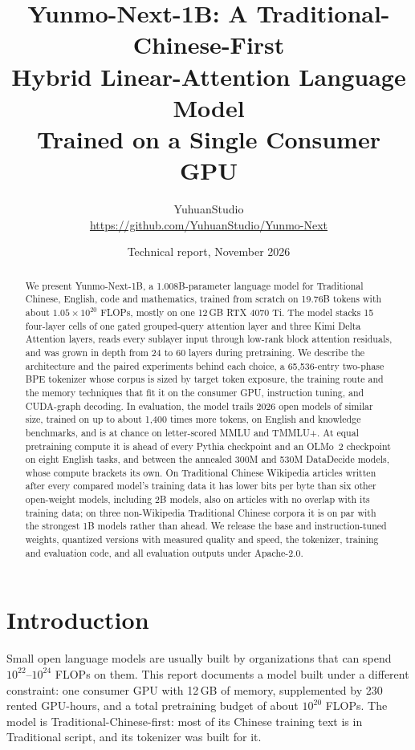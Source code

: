 \documentclass[11pt]{article}
\title{\textbf{Yunmo-Next-1B: A Traditional-Chinese-First\\Hybrid Linear-Attention Language Model\\Trained on a Single Consumer GPU}}
\author{YuhuanStudio\\[2pt]\small\url{https://github.com/YuhuanStudio/Yunmo-Next}}
\date{Technical report, November 2026}
\newcommand{\yn}{Yunmo-Next-1B}
\begin{document}
\maketitle

\begin{abstract}
We present \yn{}, a 1.008B-parameter language model for Traditional Chinese, English, code and mathematics,
trained from scratch on 19.76B tokens with about $1.05\times10^{20}$ FLOPs, mostly on one 12\,GB RTX 4070 Ti.
The model stacks 15 four-layer cells of one gated grouped-query attention layer and three Kimi Delta Attention
layers, reads every sublayer input through low-rank block attention residuals, and was grown in depth from 24
to 60 layers during pretraining. We describe the architecture and the paired experiments behind each choice,
a 65,536-entry two-phase BPE tokenizer whose corpus is sized by target token exposure, the training route and
the memory techniques that fit it on the consumer GPU, instruction tuning, and CUDA-graph decoding.
In evaluation, the model trails 2026 open models of similar size, trained on up to about 1,400 times more tokens,
on English and knowledge benchmarks, and is at chance on letter-scored MMLU and TMMLU+. At equal pretraining
compute it is ahead of every Pythia checkpoint and an OLMo~2 checkpoint on eight English tasks, and between
the annealed 300M and 530M DataDecide models, whose compute brackets its own. On Traditional Chinese Wikipedia articles
written after every compared model's training data it has lower bits per byte than six other open-weight
models, including 2B models, also on articles with no overlap with its training data; on three non-Wikipedia
Traditional Chinese corpora it is on par with the strongest 1B models rather than ahead. We release the base and
instruction-tuned weights, quantized versions with measured quality and speed, the tokenizer, training and
evaluation code, and all evaluation outputs under Apache-2.0.
\end{abstract}

\section{Introduction}

Small open language models are usually built by organizations that can spend $10^{22}$--$10^{24}$ FLOPs on
them. This report documents a model built under a different constraint: one consumer GPU with 12\,GB of memory,
supplemented by 230 rented GPU-hours, and a total pretraining budget of about $10^{20}$ FLOPs. The model is
Traditional-Chinese-first: most of its Chinese training text is in Traditional script, and its tokenizer was
built for it.
\end{document}
